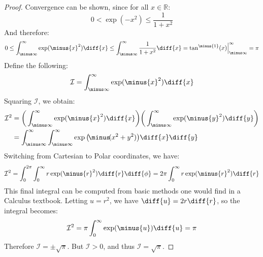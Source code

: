         \begin{proof}
            Convergence can be shown, since for
            all $x\in\mathbb{R}$:
            \begin{equation}
                0<\exp(\minus{x}^{2})
                \leq\frac{1}{1+x^2}
            \end{equation}
            And therefore:
            \begin{equation}
                0\leq\int_{\minus\infty}^{\infty}
                \exp(\minus{x}^{2})\diff{x}\leq
                \int_{\minus\infty}^{\infty}
                \frac{1}{1+x^2}\diff{x}
                =\tan^{\minus{1}}(x)
                \Big|_{\minus\infty}^{\infty}=\pi
            \end{equation}
            Define the following:
            \begin{equation}
                \mathcal{I}=\int_{\minus\infty}^{\infty}
                \exp(\minus{x}^{2})\diff{x}
            \end{equation}
            Squaring $\mathcal{I}$, we obtain:
            \begin{subequations}
                \begin{align}
                    \mathcal{I}^{2}&=
                    \bigg(\int_{\minus\infty}^{\infty}
                    \exp(\minus{x}^{2})\diff{x}\bigg)
                    \bigg(\int_{\minus\infty}^{\infty}
                    \exp(\minus{y}^{2})\diff{y}\bigg)\\
                    &=\int_{\minus\infty}^{\infty}
                    \int_{\minus\infty}^{\infty}
                    \exp\big(\!\minus\!(x^{2}+y^{2})\big)
                        \diff{x}\diff{y}
                \end{align}
            \end{subequations}
            Switching from Cartesian to
            Polar coordinates, we have:
            \begin{equation}
                \mathcal{I}^{2}=
                \int_{0}^{2\pi}\int_{0}^{\infty}
                r\exp(\minus{r}^{2})\diff{r}\diff{\phi}
                =2\pi\int_{0}^{\infty}
                r\exp(\minus{r}^{2})\diff{r}
            \end{equation}
            This final integral can be computed from basic
            methods one would find in a Calculus textbook.
            Letting $u=r^{2}$, we have
            $\diff{u}=2r\diff{r}$,
            so the integral becomes:
            \begin{equation}
                \mathcal{I}^{2}=\pi\int_{0}^{\infty}
                    \exp(\minus{u})\diff{u}
                =\pi
            \end{equation}
            Therefore $\mathcal{I}=\pm\sqrt{\pi}$.
            But $\mathcal{I}>0$, and thus
            $\mathcal{I}=\sqrt{\pi}$.
        \end{proof}
